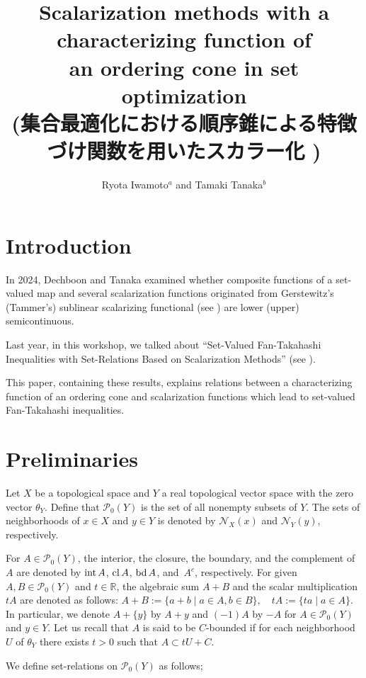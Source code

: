 \documentclass[a4paper,11pt]{jsarticle}
\title{%
Scalarization methods with a characterizing function of \\
an ordering cone in set optimization \\
  \large (集合最適化における順序錐による特徴づけ関数を用いたスカラー化
  )}
\author{
  Ryota Iwamoto$^{a}$ and Tamaki Tanaka$^{b}$
  }
\affil{
  $^{a}$Graduate school of Science and Technology, Niigata University, \\
  $^{b}$Faculty of Science, Niigata University \\
}
\date{\vspace{-5ex}}
\theoremstyle{definition}
\newcommand{\rnum}{\mathbb{R}}
\newcommand{\Interior}[1]{\mbox{\rm int}\mbox{$\,#1$}}
\newcommand{\Closure}[1]{\mbox{\rm cl}\mbox{$\,#1$}}
\newcommand{\Boundary}[1]{\mbox{\rm bd}\mbox{$\,#1$}}
\newcommand{\Complement}[1]{\mbox{$\,#1^{c}$}}
\newcommand{\pow}[1]{\mathcal{P}_{0}(#1)}
\begin{document}
\maketitle
\section{\rm Introduction}
In 2024, Dechboon and Tanaka examined whether composite functions of a set-valued
map and several scalarization functions originated from Gerstewitz's (Tammer's) sublinear
scalarizing functional (see \cite{Tammer2003})
are lower (upper) semicontinuous.

Last year, in this workshop, we talked about ``Set-Valued Fan-Takahashi Inequalities
with Set-Relations Based on Scalarization Methods'' (see \cite{IwamotoTanaka2024}).

This paper, containing these results, explains relations between
a characterizing function of an ordering cone and scalarization functions which lead to
set-valued Fan-Takahashi inequalities.

\section{\rm Preliminaries}

Let $X$ be a topological space and $Y$ a real topological vector space
with the zero vector $\theta_Y$.
Define that $\pow{Y}$ is the set of all nonempty subsets of $Y$.
The sets of neighborhoods of $x \in X$ and
$y \in Y$ is denoted by $\mathcal{N}_X (x)$ and $\mathcal{N}_Y (y)$, respectively.

For $A \in \pow{Y}$, the interior, the closure, the boundary, and the complement of $A$ are denoted by
$\Interior{A}$, $\Closure{A}$, $\Boundary{A}$, and $\Complement{A}$, respectively.
For given $A,B\in\pow{Y}$ and $t\in\rnum$,
the algebraic sum $A+B$ and the scalar multiplication $tA$ are denoted as follows:
$A+B:= \{a+b \mid a\in{A},b\in{B} \}, \quad tA:= \{ta\mid a\in{A}\}$.
In particular, we denote $A+\{y\}$ by $A+y$ and
$(-1)A$ by $-A$ for $A\in\pow{Y}$ and $y\in Y$.
Let us recall that $A$ is said to be $C$-bounded if for each neighborhood $U$ of $\theta_Y$
there exists $t > 0$ such that $A \subset tU + C$.

We define set-relations on $\pow{Y}$ as follows;
\end{document}
